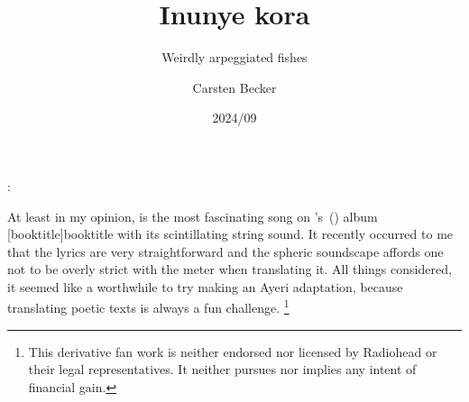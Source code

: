\documentclass[12pt,paper=a4]{scrartcl}
\author{Carsten Becker}
\title{Inunye kora}
\subtitle{Weirdly arpeggiated fishes}
\date{2024/09} %
\newenvironment{mytitle}{
	\hfill
	\begin{minipage}{0.667\textwidth}
	\vspace{\baselineskip}
	\begin{center}
		\Large
		\sffamily\bfseries
		\makeatletter
}{
		\makeatother
	\end{center}
	\vspace{1em}
	\end{minipage}
	\hfill
}
\begin{document}

\begin{mytitle}
	\@title: \@subtitle
\end{mytitle}

At least in my opinion,  is the most
fascinating song on
\citeauthor{radiohead:weirdfishes}'s~(\citeyear{radiohead:weirdfishes}) album
[booktitle]{booktitle} with its
scintillating string sound. It recently occurred to me that the lyrics are very
straightforward and the spheric soundscape affords one not to be overly strict
with the meter when translating it. All things considered, it seemed like a
worthwhile to try making an Ayeri adaptation, because translating poetic texts
is always a fun challenge.%
%
	\footnote{This derivative fan work is neither endorsed nor licensed by
	Radiohead or their legal representatives. It neither pursues nor implies
	any intent of financial gain.}
\end{document}
